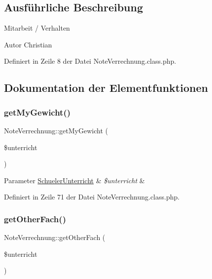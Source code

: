 \subsection{Ausführliche Beschreibung}
Mitarbeit / Verhalten \begin{DoxyAuthor}{Autor}
Christian 
\end{DoxyAuthor}


Definiert in Zeile 8 der Datei Note\+Verrechnung.\+class.\+php.



\subsection{Dokumentation der Elementfunktionen}
\mbox{\label{class_note_verrechnung_afa3f1a8b201ce1d8fdaed35fe8d45df9}} 
\subsubsection{\texorpdfstring{get\+My\+Gewicht()}{getMyGewicht()}}
{\footnotesize\ttfamily Note\+Verrechnung\+::get\+My\+Gewicht (\begin{DoxyParamCaption}\item[{}]{\$unterricht }\end{DoxyParamCaption})}


\begin{DoxyParams}[1]{Parameter}
\mbox{\hyperlink{class_schueler_unterricht}{Schueler\+Unterricht}} & {\em \$unterricht} & \\
\hline
\end{DoxyParams}


Definiert in Zeile 71 der Datei Note\+Verrechnung.\+class.\+php.

\mbox{\label{class_note_verrechnung_a8c5733d0333212d1510c3c3d68f44e91}} 
\subsubsection{\texorpdfstring{get\+Other\+Fach()}{getOtherFach()}}
{\footnotesize\ttfamily Note\+Verrechnung\+::get\+Other\+Fach (\begin{DoxyParamCaption}\item[{}]{\$unterricht }\end{DoxyParamCaption})}


